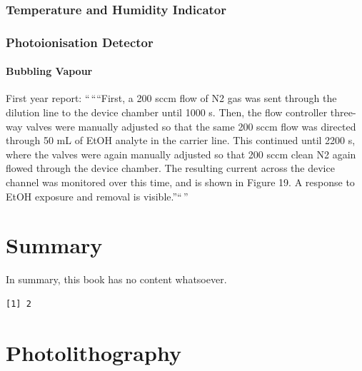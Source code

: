 \documentclass[
  a4paper,
]{scrbook}
\begin{document}
\hypertarget{temperature-and-humidity-indicator}{%
\subsection{Temperature and Humidity
Indicator}\label{temperature-and-humidity-indicator}}

\hypertarget{photoionisation-detector}{%
\subsection{Photoionisation Detector}\label{photoionisation-detector}}

\hypertarget{bubbling-vapour}{%
\subsubsection*{Bubbling Vapour}\label{bubbling-vapour}}

First year report: ``\,````First, a 200 sccm flow of N2 gas was sent
through the dilution line to the device chamber until 1000 s. Then, the
flow controller three-way valves were manually adjusted so that the same
200 sccm flow was directed through 50 mL of EtOH analyte in the carrier
line. This continued until 2200 s, where the valves were again manually
adjusted so that 200 sccm clean N2 again flowed through the device
chamber. The resulting current across the device channel was monitored
over this time, and is shown in Figure 19. A response to EtOH exposure
and removal is visible.''``\,''


\hypertarget{summary-1}{%
\chapter{Summary}\label{summary-1}}

In summary, this book has no content whatsoever.

\begin{verbatim}
[1] 2
\end{verbatim}

\appendix
{}

\hypertarget{sec-photolithography}{%
\chapter{Photolithography}\label{sec-photolithography}}
\end{document}
